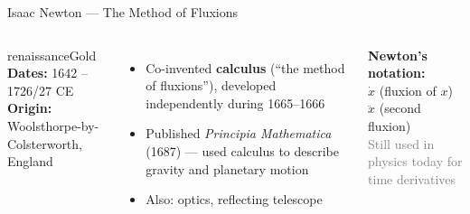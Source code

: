 \begin{frame}[shrink=4]{Isaac Newton --- The Method of Fluxions}
  \begin{columns}[T]
    \begin{personbox}{renaissanceGold}
      \textbf{Dates:} 1642 -- 1726/27 CE\\
      \textbf{Origin:} Woolsthorpe-by-Colsterworth, England
    \end{personbox}
    \vspace{0.3em}
    \begin{itemize}
      \item Co-invented \textbf{calculus} (``the method of fluxions''), developed independently during 1665--1666
      \item Published \textit{Principia Mathematica} (1687) --- used calculus to describe gravity and planetary motion
      \item Also: optics, reflecting telescope
    \end{itemize}


    \vspace{0.5em}
    \begin{tcolorbox}[colframe=renaissanceGold!60,colback=renaissanceGold!5,boxrule=0.5pt,arc=3pt]
      \centering
      \textbf{Newton's notation:}\\[4pt]
      $\dot{x}$ \quad (fluxion of $x$)\\[2pt]
      $\ddot{x}$ \quad (second fluxion)\\[6pt]
      {\footnotesize\textcolor{gray}{Still used in physics today for time derivatives}}
    \end{tcolorbox}
  \end{columns}

\end{frame}

